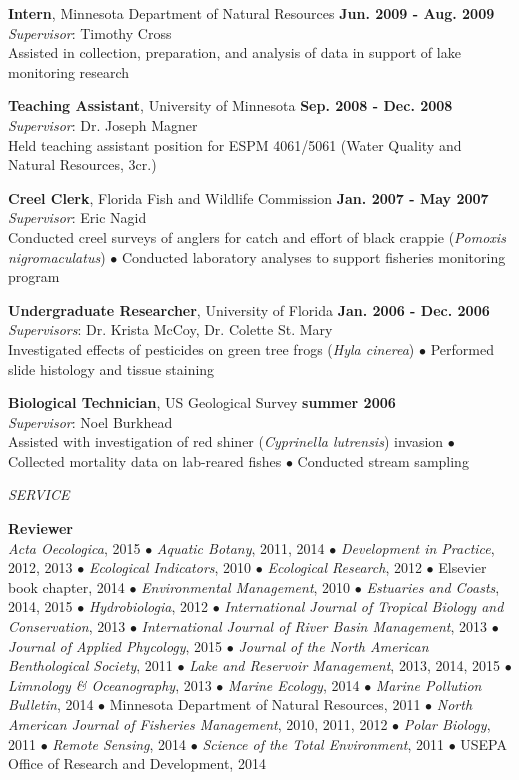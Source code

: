 \documentclass[letterpaper,12pt]{article}
\newcommand{\sectitle}[1]{\vspace{\baselineskip} \centerline{\large{\textit{#1}}}}
\begin{document}
{\bf Intern}, Minnesota Department of Natural Resources \hfill {\bf Jun. 2009 - Aug. 2009} \\
\textit{Supervisor}: Timothy Cross \\
Assisted in collection, preparation, and analysis of data in support of lake monitoring research

{\bf Teaching Assistant}, University of Minnesota \hfill {\bf Sep. 2008 - Dec. 2008} \\
\textit{Supervisor}: Dr. Joseph Magner \\
Held teaching assistant position for ESPM 4061/5061 (Water Quality and Natural Resources, 3cr.)

{\bf Creel Clerk}, Florida Fish and Wildlife Commission \hfill {\bf Jan. 2007 - May 2007} \\
\textit{Supervisor}: Eric Nagid \\
Conducted creel surveys of anglers for catch and effort of black crappie (\textit{Pomoxis nigromaculatus}) $\bullet$ Conducted laboratory analyses to support fisheries monitoring program

{\bf Undergraduate Researcher}, University of Florida \hfill {\bf Jan. 2006 - Dec. 2006} \\
\textit{Supervisors}: Dr. Krista McCoy, Dr. Colette St. Mary \\
Investigated effects of pesticides on green tree frogs (\textit{Hyla cinerea}) $\bullet$ Performed slide histology and tissue staining

{\bf Biological Technician}, US Geological Survey \hfill {\bf summer 2006} \\
\textit{Supervisor}: Noel Burkhead \\
Assisted with investigation of red shiner (\textit{Cyprinella lutrensis}) invasion $\bullet$ Collected mortality data on lab-reared fishes $\bullet$ Conducted stream sampling

\sectitle{SERVICE}

{\bf Reviewer}\hfill \\
\textit{Acta Oecologica}, 2015 $\bullet$ \textit{Aquatic Botany}, 2011, 2014 $\bullet$ \textit{Development in Practice}, 2012, 2013 $\bullet$ \textit{Ecological Indicators}, 2010 $\bullet$ \textit{Ecological Research}, 2012 $\bullet$ Elsevier book chapter, 2014 $\bullet$ \textit{Environmental Management}, 2010 $\bullet$ \textit{Estuaries and Coasts}, 2014, 2015 $\bullet$ \textit{Hydrobiologia}, 2012 $\bullet$ \textit{International Journal of Tropical Biology and Conservation}, 2013 $\bullet$ \textit{International Journal of River Basin Management}, 2013 $\bullet$ \textit{Journal of Applied Phycology}, 2015 $\bullet$ \textit{Journal of the North American Benthological Society}, 2011 $\bullet$ \textit{Lake and Reservoir Management}, 2013, 2014, 2015 $\bullet$ \textit{Limnology \& Oceanography}, 2013 $\bullet$ \textit{Marine Ecology}, 2014 $\bullet$ \textit{Marine Pollution Bulletin}, 2014 $\bullet$ Minnesota Department of Natural Resources, 2011 $\bullet$ \textit{North American Journal of Fisheries Management}, 2010, 2011, 2012 $\bullet$ \textit{Polar Biology}, 2011 $\bullet$ \textit{Remote Sensing}, 2014 $\bullet$ \textit{Science of the Total Environment}, 2011 $\bullet$ USEPA Office of Research and Development, 2014
\end{document}
